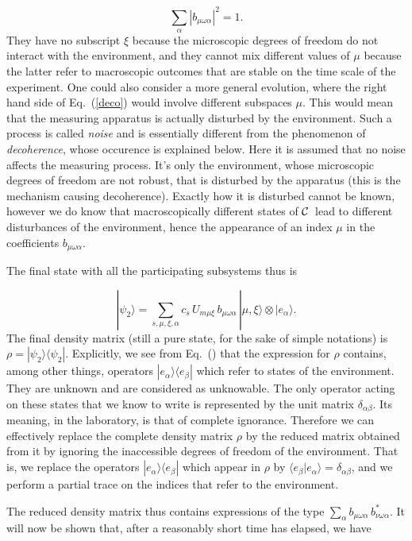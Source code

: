 \documentclass[12pt]{article}
\def\beq{\begin{equation}}
\def\eeq{\end{equation}}
\def\Eq{Eq.~(\ref}
\def\0{\otimes}
\def\6{\langle}
\def\9{\rangle}
\def\cC{$\cal C$}
\begin{document}
\beq \sum_\alpha |b_{\mu\omega\alpha}|^2=1. \label{bnorm}\eeq
They have no subscript $\xi$ because the microscopic degrees of freedom
do not interact with the environment, and they cannot mix different
values of $\mu$ because the latter refer to macroscopic outcomes that
are stable on the time scale of the experiment. One could also consider
a more general evolution, where the right hand side of \Eq{deco}) would
involve different subspaces $\mu$. This would mean that the measuring
apparatus is actually disturbed by the environment. Such a process is
called {\it noise\/} and is essentially different from the phenomenon of
{\it decoherence\/}, whose occurence is explained below. Here it is
assumed that no noise affects the measuring process. It's only the
environment, whose microscopic degrees of freedom are not robust, that
is disturbed by the apparatus (this is the mechanism causing
decoherence). Exactly how it is disturbed cannot be known, however we do
know that macroscopically different states of \cC\ lead to different
disturbances of the environment, hence the appearance of an index $\mu$
in the coefficients $b_{\mu\omega\alpha}$.

The final state with all the participating subsystems thus is

\beq |\psi_2\9=\sum_{s,\mu,\xi,\alpha}c_s\,U_{m\mu\xi}\,
  b_{\mu\omega\alpha}\,|\mu,\xi\9\0|e_\alpha\9. \eeq
The final density matrix (still a pure state, for the sake of simple
notations) is $\rho=|\psi_2\9\6\psi_2|$. Explicitly, we see from
Eq.~(\theequation) that the expression for $\rho$ contains, among other
things, operators $|e_\alpha\9\6e_\beta|$ which refer to states of the
environment. They are unknown and are considered as unknowable. The only
operator acting on these states that we know to write is represented by
the unit matrix $\delta_{\alpha\beta}$. Its meaning, in the laboratory,
is that of complete ignorance. Therefore we can effectively replace the
complete density matrix $\rho$ by the reduced matrix obtained from it by
ignoring the inaccessible degrees of freedom of the environment. That
is, we replace the operators $|e_\alpha\9\6e_\beta|$ which appear in
$\rho$ by $\6e_\beta|e_\alpha\9=\delta_{\alpha\beta}$, and we perform a
partial trace on the indices that refer to the environment.

The reduced density matrix thus contains expressions of the type
$\sum_\alpha b_{\mu\omega\alpha}\,b^*_{\nu\omega\alpha}$. It will now be
shown that, after a reasonably short time has elapsed, we have
\end{document}
